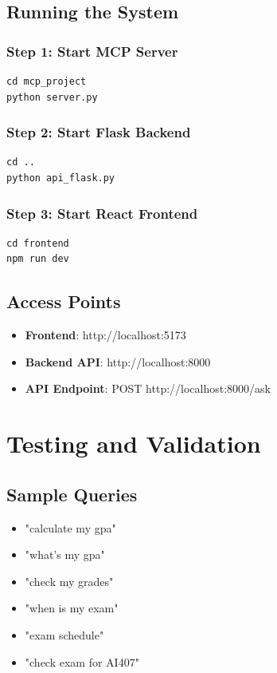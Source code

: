 \documentclass[12pt, a4paper]{report}
\begin{document}
\section{Running the System}
\subsection{Step 1: Start MCP Server}
\begin{verbatim}
cd mcp_project
python server.py
\end{verbatim}

\subsection{Step 2: Start Flask Backend}
\begin{verbatim}
cd ..
python api_flask.py
\end{verbatim}

\subsection{Step 3: Start React Frontend}
\begin{verbatim}
cd frontend
npm run dev
\end{verbatim}

\section{Access Points}
\begin{itemize}
    \item \textbf{Frontend}: http://localhost:5173
    \item \textbf{Backend API}: http://localhost:8000
    \item \textbf{API Endpoint}: POST http://localhost:8000/ask
\end{itemize}

\chapter{Testing and Validation}

\section{Sample Queries}
\begin{itemize}
    \item "calculate my gpa"
    \item "what's my gpa"
    \item "check my grades"
    \item "when is my exam"
    \item "exam schedule"
    \item "check exam for AI407"
\end{itemize}
\end{document}

